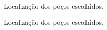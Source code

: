 \begin{figure}[H]
	\centering
	\setlength{\fboxsep}{8pt}
	\setlength{\fboxrule}{0.1pt}
	\caption{Localização dos poços escolhidos.}
	\label{loc02}
\end{figure}

\begin{figure}[H]
	\centering
	\setlength{\fboxsep}{8pt}
	\setlength{\fboxrule}{0.1pt}
	\caption{Localização dos poços escolhidos.}
	\label{loc03}
\end{figure}
